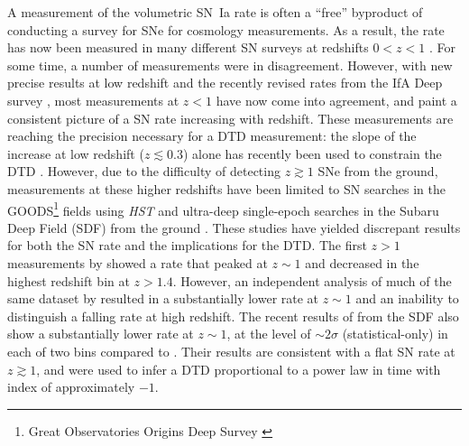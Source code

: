 A measurement of the volumetric SN~Ia rate is often a ``free''
byproduct of conducting a survey for SNe for cosmology
measurements. As a result, the rate has now been measured in many
different SN surveys at redshifts $0<z<1$
\citep[e.g.]{pain02a,neill07a}. For some time, a number of
measurements were in disagreement. However, with new precise results
at low redshift \citep{dilday10a,li10a} and the recently revised rates
from the IfA Deep survey \citep{rodney10a}, most measurements at $z<1$
have now come into agreement, and paint a consistent picture of a SN
rate increasing with redshift. These measurements are reaching the
precision necessary for a DTD measurement: the slope of the increase
at low redshift ($z \lesssim 0.3$) alone has recently been used to
constrain the DTD \citep{horiuchi10a}.  However, due to the difficulty
of detecting $z \gtrsim 1$ SNe from the ground, measurements at these
higher redshifts have been limited to SN searches in the
GOODS\footnote{Great Observatories Origins Deep Survey
  \citep{giavalisco04a}} fields
\citep{dahlen04a,kuznetsova08a,dahlen08a} using \emph{HST} and
ultra-deep single-epoch searches in the Subaru Deep Field (SDF) from
the ground \citep{poznanski07a,graur11a}. These studies have yielded
discrepant results for both the SN rate and the implications for the
DTD. The first $z>1$ measurements by \citet{dahlen04a} \citep[and
  later][with an expanded dataset]{dahlen08a} showed a rate that
peaked at $z \sim 1$ and decreased in the highest redshift bin at
$z>1.4$. However, an independent analysis of much of the same dataset
by \citet{kuznetsova08a} resulted in a substantially lower rate at $z
\sim 1$ and an inability to distinguish a falling rate at high
redshift. The recent results of \citet{graur11a} from the SDF also
show a substantially lower rate at $z \sim 1$, at the level of
$\sim$$2\sigma$ (statistical-only) in each of two bins compared to
\citet{dahlen04a}. Their results are consistent with a flat SN rate at
$z \gtrsim 1$, and were used to infer a DTD proportional to a power
law in time with index of approximately $-1$.


